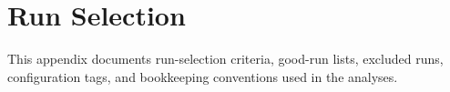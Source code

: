 \section{Run Selection}

This appendix documents run-selection criteria, good-run lists, excluded runs,
configuration tags, and bookkeeping conventions used in the analyses.
